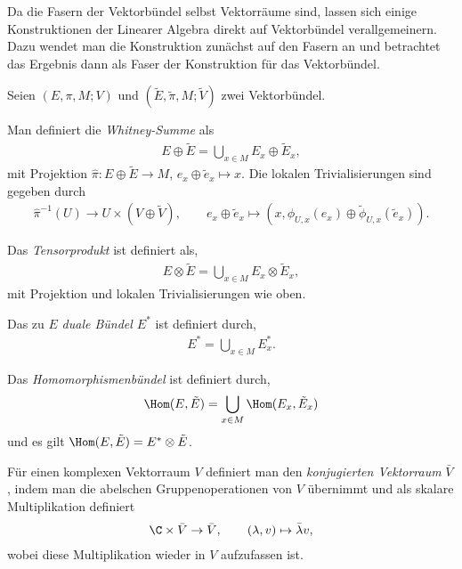 \documentclass[%
	paper=a5,%
	fleqn,%
	DIV=18,%
	BCOR=0mm,
	fontsize=11pt,
	titlepage=false,%
	bibliography=totoc,
	DIV=18,%
	twoside=true,
	pdftitle=Riemannsche Geometrie,
	pdfauthor=Uwe Semmelmann,
	numbers=noendperiod]%
	{scrbook}
\begin{document}
Da die Fasern der Vektorbündel selbst Vektorräume sind, lassen sich einige
Konstruktionen der Linearer Algebra direkt auf Vektorbündel
verallgemeinern. Dazu wendet man die Konstruktion zunächst auf den Fasern
an und betrachtet das Ergebnis dann als Faser der Konstruktion für das
Vektorbündel.

\begin{defn}
Seien $(E,\pi,M;V)$ und $(\tilde{E},\tilde{\pi},M;\tilde{V})$ zwei Vektorbündel.
\begin{defnenum}
\item Man definiert die \emph{Whitney-Summe} als
\begin{align*}
E\oplus \tilde{E} = \bigcup_{x\in M} E_x\oplus \tilde{E}_x,
\end{align*}
mit Projektion $\hat{\pi} : E\oplus \tilde{E}\to M$, $e_x\oplus
\tilde{e}_x\mapsto x$. Die lokalen Trivialisierungen sind gegeben durch
\begin{align*}
\hat{\pi}^{-1}(U)\to U\times (V\oplus \tilde{V}),\qquad
e_x\oplus \tilde{e}_x \mapsto (x,\phi_{U,x}(e_x)\oplus
\tilde{\phi}_{U,x}(\tilde{e}_x)).
\end{align*}
\item Das \emph{Tensorprodukt} ist definiert als,
\begin{align*}
E\otimes \tilde{E} = \bigcup_{x\in M} E_x\otimes \tilde{E}_x,
\end{align*}
mit Projektion und lokalen Trivialisierungen wie oben.
\item Das zu $E$ \emph{duale Bündel $E^*$} ist definiert durch,
\begin{align*}
E^* = \bigcup_{x\in M} E_x^*.
\end{align*}
\item Das \emph{Homomorphismenbündel} ist definiert durch,
\begin{align*}
\Hom(E,\tilde{E}) = \bigcup_{x\in M} \Hom(E_x,\tilde{E}_x)
\end{align*}
und es gilt $\Hom(E,\tilde{E}) =  E^* \otimes \tilde{E}$.\fish
\end{defnenum}
\end{defn}

Für einen komplexen Vektorraum $V$ definiert man den \textit{konjugierten
Vektorraum} $\bar{V}$, indem man die abelschen Gruppenoperationen von $V$
übernimmt und als skalare Multiplikation definiert
\begin{align*}
\C\times \bar{V}\to \bar{V},\qquad (\lambda,v)\mapsto \bar{\lambda}v,
\end{align*}
wobei diese Multiplikation wieder in $V$ aufzufassen ist.
\end{document}
